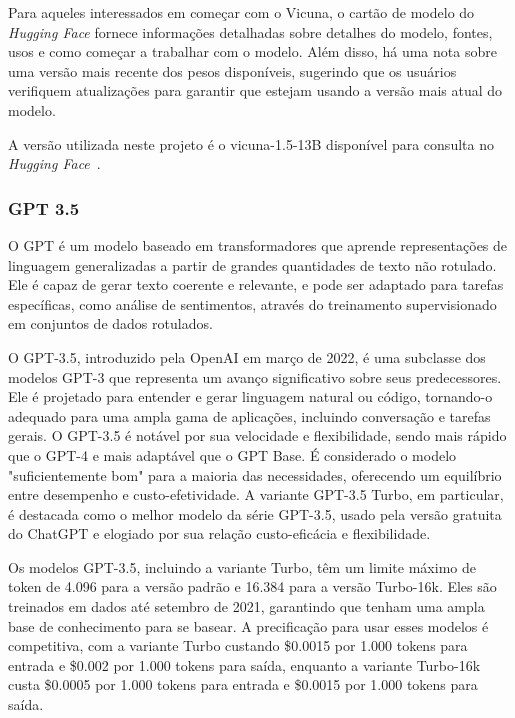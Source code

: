 Para aqueles interessados em começar com o Vicuna, o cartão de modelo do \textit{Hugging Face} fornece informações detalhadas sobre detalhes do modelo, fontes, usos e como começar a trabalhar com o modelo. Além disso, há uma nota sobre uma versão mais recente dos pesos disponíveis, sugerindo que os usuários verifiquem atualizações para garantir que estejam usando a versão mais atual do modelo.

A versão utilizada neste projeto é o vicuna-1.5-13B disponível para consulta no \textit{Hugging Face}~\cite{vicuna1513b}.

\subsubsection{GPT 3.5}
\label{cap:fund_teorica:sec:modelos:subsec:gpt}

O GPT é um modelo baseado em transformadores que aprende representações de linguagem generalizadas a partir de grandes quantidades de texto não rotulado. Ele é capaz de gerar texto coerente e relevante, e pode ser adaptado para tarefas específicas, como análise de sentimentos, através do treinamento supervisionado em conjuntos de dados rotulados.

O GPT-3.5, introduzido pela OpenAI em março de 2022, é uma subclasse dos modelos GPT-3 que representa um avanço significativo sobre seus predecessores. Ele é projetado para entender e gerar linguagem natural ou código, tornando-o adequado para uma ampla gama de aplicações, incluindo conversação e tarefas gerais. O GPT-3.5 é notável por sua velocidade e flexibilidade, sendo mais rápido que o GPT-4 e mais adaptável que o GPT Base. É considerado o modelo "suficientemente bom" para a maioria das necessidades, oferecendo um equilíbrio entre desempenho e custo-efetividade. A variante GPT-3.5 Turbo, em particular, é destacada como o melhor modelo da série GPT-3.5, usado pela versão gratuita do ChatGPT e elogiado por sua relação custo-eficácia e flexibilidade.

Os modelos GPT-3.5, incluindo a variante Turbo, têm um limite máximo de token de 4.096 para a versão padrão e 16.384 para a versão Turbo-16k. Eles são treinados em dados até setembro de 2021, garantindo que tenham uma ampla base de conhecimento para se basear. A precificação para usar esses modelos é competitiva, com a variante Turbo custando \$0.0015 por 1.000 tokens para entrada e \$0.002 por 1.000 tokens para saída, enquanto a variante Turbo-16k custa \$0.0005 por 1.000 tokens para entrada e \$0.0015 por 1.000 tokens para saída.

